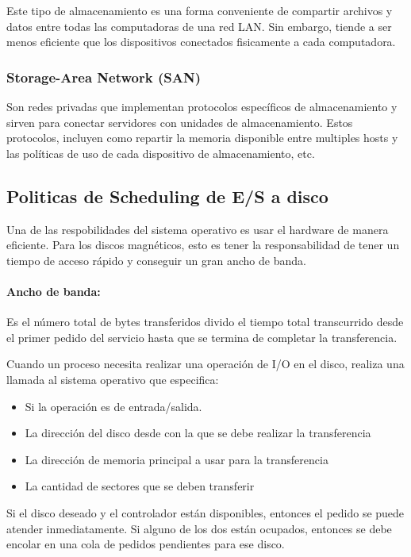 Este tipo de almacenamiento es una forma conveniente de compartir archivos y datos entre todas las computadoras de una red LAN. Sin embargo, tiende a ser menos eficiente que los dispositivos conectados fisicamente a cada computadora.
 
\subsubsection{Storage-Area Network (SAN)}
Son redes privadas que implementan protocolos específicos de almacenamiento y sirven para conectar servidores con unidades de almacenamiento. Estos protocolos, incluyen como repartir la memoria disponible entre multiples hosts y las políticas de uso de cada dispositivo de almacenamiento, etc.

\subsection{Politicas de Scheduling de E/S a disco}


Una de las respobilidades del sistema operativo es usar el hardware de manera eficiente. Para los discos magnéticos, esto es tener la responsabilidad de tener un tiempo de acceso rápido y conseguir un gran ancho de banda. 

\paragraph{Ancho de banda:} Es el número total de bytes transferidos divido el tiempo total transcurrido desde el primer pedido del servicio hasta que se termina de completar la transferencia.

\vspace*{5mm}
Cuando un proceso necesita realizar una operación de I/O en el disco, realiza una llamada al sistema operativo que especifica:
\begin{itemize}
	\item Si la operación es de entrada/salida.
	\item La dirección del disco desde con la que se debe realizar la transferencia
	\item La dirección de memoria principal a usar para la transferencia
	\item La cantidad de sectores que se deben transferir
\end{itemize}
Si el disco deseado y el controlador están disponibles, entonces el pedido se puede atender inmediatamente. Si alguno de los dos están ocupados, entonces se debe encolar en una cola de pedidos pendientes para ese disco. 

